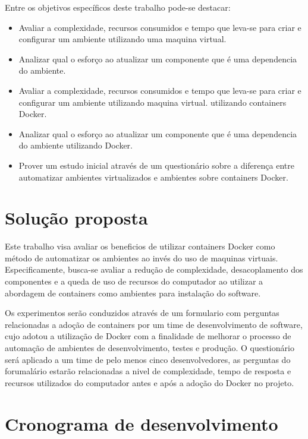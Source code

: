 \documentclass[11pt,a4paper]{article}
\begin{document}
Entre os objetivos específicos deste trabalho pode-se destacar:

\begin{itemize}
  \item Avaliar a complexidade, recursos consumidos e tempo que leva-se para criar e configurar um ambiente
    utilizando uma maquina virtual.
  \item Analizar qual o esforço ao atualizar um componente que é uma dependencia do ambiente.
  \item Avaliar a complexidade, recursos consumidos e tempo que leva-se para criar e configurar um ambiente
    utilizando maquina virtual.
    utilizando containers Docker.
  \item Analizar qual o esforço ao atualizar um componente que é uma dependencia do ambiente utilizando Docker.
  \item Prover um estudo inicial através de um questionário sobre a diferença entre automatizar
    ambientes virtualizados e ambientes sobre containers Docker.
\end{itemize}

\section{Solução proposta}

Este trabalho visa avaliar os beneficios de utilizar containers Docker como método de automatizar os ambientes
ao invés do uso de maquinas virtuais. Especificamente, busca-se avaliar a redução de complexidade, desacoplamento dos
componentes e a queda de uso de recursos do computador ao utilizar a abordagem de containers como ambientes para instalação
do software.

Os experimentos serão conduzidos através de um formulario com perguntas relacionadas a adoção de containers por um time
de desenvolvimento de software, cujo adotou a utilização de Docker com a finalidade de melhorar o processo de automação
de ambientes de desenvolvimento, testes e produção. O questionário será aplicado a um time de pelo menos cinco desenvolvedores,
as perguntas do forumalário estarão relacionadas a nivel de complexidade, tempo de resposta e recursos utilizados do computador
antes e após a adoção do Docker no projeto.

\section{Cronograma de desenvolvimento}\label{sec:cronograma}
\end{document}
